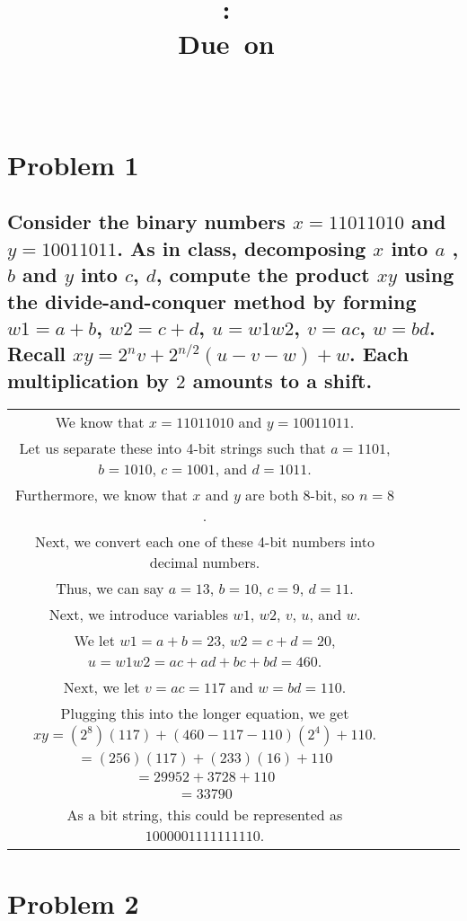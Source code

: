 \documentclass{article}
\title{
    \vspace{2in}
    \textmd{\textbf{\hmwkClass:\ \hmwkTitle}}\\
    \normalsize\vspace{0.1in}\small{Due\ on\ \hmwkDueDate}\\
    \vspace{0.1in}\large{\textit{\hmwkClassInstructor\ \hmwkClassTime}}
    \vspace{3in}
}
\author{\hmwkAuthorName}
\date{}
\begin{document}
\maketitle
\pagebreak

\section*{Problem 1}
\subsection*{Consider the binary numbers $x=11011010$ and $y = 10011011$. As in class, decomposing $x$ into $a$
, $b$ and $y$ into $c$, $d$, compute the product $xy$ using the divide-and-conquer method by forming $w1=a+b$,
$w2=c+d$, $u=w1 w2$, $v=ac$, $w=bd$. Recall $xy=2^nv+2^{n/2}(u-v-w)+w$. Each multiplication by $2$
amounts to a shift.}
\begin{center}
	\begin{tabular} {c c c c c}
        We know that $x=11011010$ and $y=10011011$.\\
        Let us separate these into 4-bit strings such that $a=1101$, $b=1010$, $c=1001$, and $d=1011$.\\
        Furthermore, we know that $x$ and $y$ are both 8-bit, so $n=8$.\\
        Next, we convert each one of these 4-bit numbers into decimal numbers.\\
        Thus, we can say $a=13$, $b=10$, $c=9$, $d=11$.\\
        Next, we introduce variables $w1$, $w2$, $v$, $u$, and $w$.\\
        We let $w1=a+b=23$, $w2=c+d=20$, $u=w1 w2=ac+ad+bc+bd=460$.\\
        Next, we let $v=ac=117$ and $w=bd=110$.\\
        Plugging this into the longer equation, we get $xy=(2^8)(117)+(460-117-110)(2^4)+110$.\\
        $=(256)(117)+(233)(16)+110$\\
        $=29952+3728+110$\\
        $=33790$\\
        As a bit string, this could be represented as $1000001111111110$.\\
	\end{tabular}
\end{center}

\section*{Problem 2}
\end{document}
